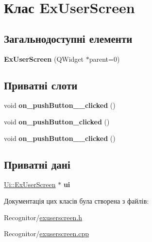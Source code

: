 \hypertarget{classExUserScreen}{\section{Клас Ex\-User\-Screen}
\label{classExUserScreen}
}
\subsection*{Загальнодоступні елементи}
\begin{DoxyCompactItemize}
\item 
\hypertarget{classExUserScreen_a8642db4f09c4528daf7e22ce2dcc1b47}{{\bfseries Ex\-User\-Screen} (Q\-Widget $\ast$parent=0)}\label{classExUserScreen_a8642db4f09c4528daf7e22ce2dcc1b47}

\end{DoxyCompactItemize}
\subsection*{Приватні слоти}
\begin{DoxyCompactItemize}
\item 
\hypertarget{classExUserScreen_a30a26ad349a33bac86a0848934c55655}{void {\bfseries on\-\_\-push\-Button\-\_\-\_\-clicked} ()}\label{classExUserScreen_a30a26ad349a33bac86a0848934c55655}

\item 
\hypertarget{classExUserScreen_a4c7d4f567fc5d87bf459c4fe9ae09411}{void {\bfseries on\-\_\-push\-Button\-\_\-clicked} ()}\label{classExUserScreen_a4c7d4f567fc5d87bf459c4fe9ae09411}

\item 
\hypertarget{classExUserScreen_ad5eeeac687e031eb0b722957b20191cf}{void {\bfseries on\-\_\-push\-Button\-\_\-\_\-clicked} ()}\label{classExUserScreen_ad5eeeac687e031eb0b722957b20191cf}

\end{DoxyCompactItemize}
\subsection*{Приватні дані}
\begin{DoxyCompactItemize}
\item 
\hypertarget{classExUserScreen_abed6a95638d506058d3b1e6e69a42788}{\hyperlink{classUi_1_1ExUserScreen}{Ui\-::\-Ex\-User\-Screen} $\ast$ {\bfseries ui}}\label{classExUserScreen_abed6a95638d506058d3b1e6e69a42788}

\end{DoxyCompactItemize}


Документація цих класів була створена з файлів\-:\begin{DoxyCompactItemize}
\item 
Recognitor/\hyperlink{exuserscreen_8h}{exuserscreen.\-h}\item 
Recognitor/\hyperlink{exuserscreen_8cpp}{exuserscreen.\-cpp}\end{DoxyCompactItemize}
